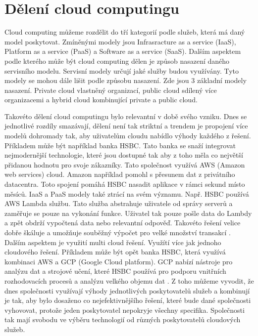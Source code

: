 \section{Dělení cloud computingu}
    Cloud computing můžeme rozdělit do tří kategorií podle služeb, která má daný model poskytovat. Zmíněnými modely jsou Infrasracture as a service (IaaS), Platform as a service (PaaS) a Software as a service (SaaS). Dalším aspektem podle kterého může být cloud computing dělen je způsob nasazení daného servisního modelu. Servisní modely určují jaké služby budou využívány. Tyto modely se mohou dále lišit podle způsobu nasazení. Zde jsou 3 základní modely nasazení. Private cloud vlastněný organizací, public cloud sdílený více organizacemi a hybrid cloud kombinující private a public cloud. \par
        Takovéto dělení cloud computingu bylo relevantní v době svého vzniku. Dnes se jednotlivé rozdíly smazávají, dělení není tak striktní a trendem je propojení více \linebreak modelů dohromady tak, aby uživatelům cloudu nabídlo výhody každého z řešení. Příkladem může být například banka HSBC. Tato banka se snaží integrovat \linebreak nejmodernější technologie, které jsou dostupné tak aby z toho měla co největší přidanou hodnotu pro svoje zákazníky. Tato společnost využívá AWS (Amazon web services) cloud. Amazon například pomohl s přesunem dat z privátního datacentra. Toto spojení pomáhá HSBC nasadit aplikace v rámci sekund místo měsíců. IaaS a PaaS \linebreak modely také ztrácí na svém významu. Např. HSBC používá AWS Lambda službu. Tato služba abstrahuje uživatele od správy serverů a zaměřuje se pouze na vykonání funkce. Uživatel tak pouze pošle data do Lambdy a zpět obdrží vypočtená data nebo relevantní odpověď. Takovéto řešení velice dobře škáluje a umožňuje souběžný výpočet pro velké množství transakcí \cite{devopsonline}. Dalším aspektem je využití multi cloud řešení. Využítí více jak jednoho cloudového řešení. Příkladem může být opět banka HSBC, která využívá kombinaci AWS a GCP (Google Cloud platform). GCP nabízí nástroje pro analýzu dat a strojové učení, které HSBC používá pro podporu vnitřních rozhodovacích procesů a analýzu velkého objemu dat \cite{digitalnewasia}. Z toho můžeme vyvodit, že dnes společnosti využívají výhody jednotlivých poskytovatelů služeb a kombinují je tak, aby bylo dosaženo co nejefektivnějšího řešení, které bude dané společnosti vyhovovat, protože jeden poskytovatel nepokryje všechny specifika. Společnosti tak mají svobodu ve výběru technologií od různých poskytovatelů cloudových služeb.\par
